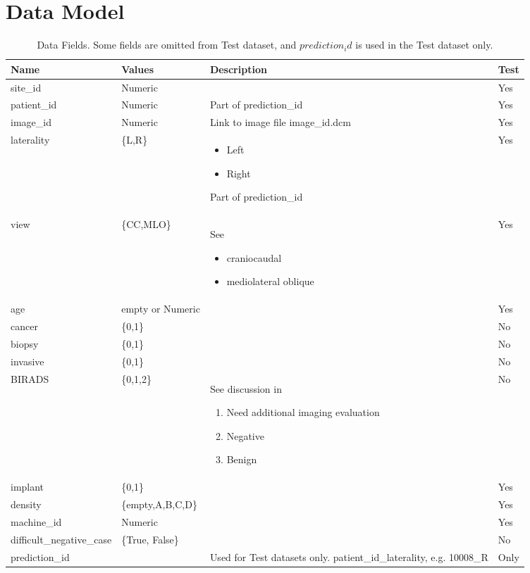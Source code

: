\documentclass[]{article}
\begin{document}
\section{Data Model}
\begin{table}[H]
	\begin{center}
		\caption[Data Fields]{Data Fields. Some fields are omitted from Test dataset, and $prediction_id$ is used in the Test dataset only.}
		\begin{tabular}{|l|l|p{5cm}|l|}   \hline
			Name&Values&Description&Test\\  \hline
			site\_id&Numeric&&Yes\\  \hline
			patient\_id&Numeric&Part of	prediction\_id&Yes\\  \hline
			image\_id&Numeric&Link to image file image\_id.dcm&Yes\\  \hline
			laterality&\{L,R\}&\begin{itemize}
				\item Left
				\item Right
			\end{itemize}Part of	prediction\_id&Yes\\  \hline
			view&\{CC,MLO\}& See \cite{murphy2021mamography} \begin{itemize}
				\item craniocaudal 
				\item mediolateral oblique
			\end{itemize}&Yes\\  \hline
			age&empty or Numeric&&Yes\\  \hline
			cancer&\{0,1\}&&No\\  \hline
			biopsy&\{0,1\}&&No\\  \hline
			invasive&\{0,1\}&&No\\  \hline
			BIRADS&\{0,1,2\}&See discussion in \cite{pan2022what}\begin{enumerate}[start=0]
				\item Need additional imaging evaluation
				\item Negative
				\item Benign
			\end{enumerate}&No\\  \hline
			implant&\{0,1\}&&Yes\\  \hline
			density&\{empty,A,B,C,D\}&&Yes\\  \hline
			machine\_id&Numeric&&Yes\\  \hline
			difficult\_negative\_case&\{True, False\}&&No\\  \hline
			prediction\_id&&Used for Test datasets only. patient\_id\_laterality, e.g. 10008\_R&Only\\  \hline
		\end{tabular}
	\end{center}
\end{table}
\end{document}
